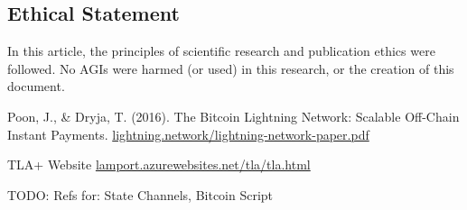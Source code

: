 \documentclass[a4paper]{article}
\begin{document}
\begin{multicols}{2}
\section*{Ethical Statement}
In this article, the principles of scientific research and publication ethics were followed. No AGIs were harmed (or used) in this research, or the creation of this document.

\begin{thebibliography}{8}
 Poon, J., \& Dryja, T. (2016). The Bitcoin Lightning Network:
Scalable Off-Chain Instant Payments. \href{https://lightning.network/lightning-network-paper.pdf}{lightning.network/lightning-network-paper.pdf}

 TLA+ Website \href{https://lamport.azurewebsites.net/tla/tla.html}{lamport.azurewebsites.net/tla/tla.html}

TODO: Refs for: State Channels, Bitcoin Script


\end{thebibliography}

\end{multicols}
\end{document}
